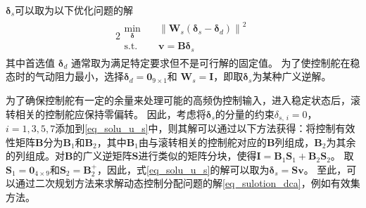 ${{\bm{ \delta}}_{ {s}}}$可以取为以下优化问题的解
\begin{alignat}{2}
\begin{split}
\mathop {{\text{min}}}\limits_{\bm{ \delta} }\quad&{\left\| {{\bm{W}_{ {s}}}\left( {{\bm{ \delta}_{ {s}}} - {\bm{ \delta}_{ {d}}}} \right)} \right\|^2} \\
\mbox{s.t.}\quad
&\bm{v }=\bm{B}\bm{ \delta}_{ {s}}
\end{split} \label{eq_solu_u_s}
\end{alignat}
其中首选值 ${{\bm{ \delta}}_{ {d}}}$ 通常取为满足特定要求但不是可行解的固定值。 为了使控制舵在稳态时的气动阻力最小，选择${{\bm{ \delta}}_{ {d}}}={{\bm{0}}_{9\times 1}}$和 ${{\bm{W}}_{ {s}}}\bm{=I}$，即取${{\bm{ \delta}}_{ {s}}}$为某种广义逆解。

为了确保控制舵有一定的余量来处理可能的高频伪控制输入，进入稳定状态后，滚转相关的控制舵应保持零偏转。 因此，考虑将$ \bm{ \delta}_{ {s}} $的分量的约束${ \delta_{ {s},\, {i}}}=0$， $i=1,3,5,7$添加到\eqref{eq_solu_u_s}中，则其解可以通过以下方法获得：将控制有效性矩阵$\bm{B}$分为${{\bm{B}}_{1}}$和${{\bm{B}}_{2}}$，其中${{\bm{B}}_{1}}$由与滚转相关的控制舵对应的$\bm{B}$列组成，${{\bm{B}}_{2}}$为其余的列组成。对$\bm{B}$的广义逆矩阵$\bm{S}$进行类似的矩阵分块，使得$\bm{I} ={\bm{B}_1}{\bm{S}_1} + {\bm{B}_2}{\bm{S}_2}$。 取${{\bm{S}}_{1}}={{\bm{0}}_{4\times 9}}$和${{\bm{S}}_{2}}=\bm{B}_{2}^{+}$，因此，式\eqref{eq_solu_u_s}的解可以取为${{\bm{ \delta}}_{ {s}}}=\bm{S}\bm{v}$。 至此，可以通过二次规划方法来求解动态控制分配问题的解\eqref {eq_sulotion_dca}，例如有效集方法。
